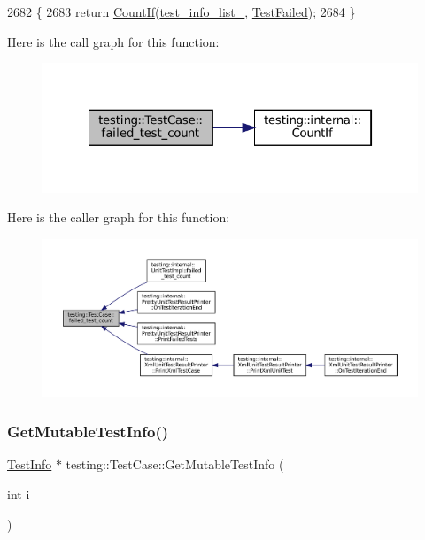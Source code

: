 \begin{DoxyCode}
2682                                       \{
2683   \textcolor{keywordflow}{return} \hyperlink{namespacetesting_1_1internal_a1e77a774d910346eff11a86d8df783a5}{CountIf}(\hyperlink{classtesting_1_1TestCase_adce272a48399dd67a7bdd14fa7e99b80}{test\_info\_list\_}, \hyperlink{classtesting_1_1TestCase_a5922884cb8b4819e869146dc315a1ac1}{TestFailed});
2684 \}
\end{DoxyCode}
Here is the call graph for this function\+:
\nopagebreak
\begin{figure}[H]
\begin{center}
\leavevmode
\includegraphics[width=322pt]{classtesting_1_1TestCase_a70e26eb070c75ae62a191fa610ea234f_cgraph}
\end{center}
\end{figure}
Here is the caller graph for this function\+:
\nopagebreak
\begin{figure}[H]
\begin{center}
\leavevmode
\includegraphics[width=350pt]{classtesting_1_1TestCase_a70e26eb070c75ae62a191fa610ea234f_icgraph}
\end{center}
\end{figure}
\mbox{\label{classtesting_1_1TestCase_aee03569f8ecb89cfe479e71f11edc3ea}} 
\subsubsection{\texorpdfstring{Get\+Mutable\+Test\+Info()}{GetMutableTestInfo()}}
{\footnotesize\ttfamily \hyperlink{classtesting_1_1TestInfo}{Test\+Info} $\ast$ testing\+::\+Test\+Case\+::\+Get\+Mutable\+Test\+Info (\begin{DoxyParamCaption}\item[{int}]{i }\end{DoxyParamCaption})\hspace{0.3cm}{\ttfamily [private]}}



